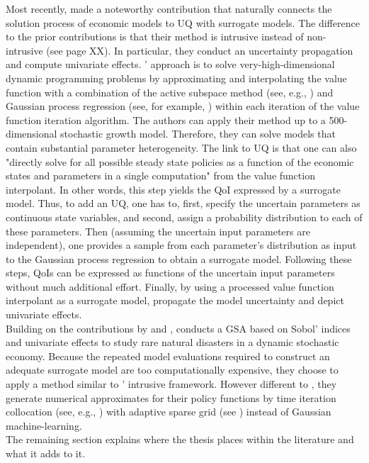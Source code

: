 \newline
Most recently, \cite{Scheidegger.2019} made a noteworthy contribution that naturally connects the solution process of economic models to UQ with surrogate models. The difference to the prior contributions is that their method is intrusive instead of non-intrusive (see page XX). In particular, they conduct an uncertainty propagation and compute univariate effects. \citeauthor{Scheidegger.2019}' approach is to solve very-high-dimensional dynamic programming problems by approximating and interpolating the value function with a combination of the active subspace method (see, e.g., \cite{Constantine.2015}) and Gaussian process regression (see, for example, \cite{Rasmussen.2005}) within each iteration of the value function iteration algorithm. The authors can apply their method up to a 500-dimensional stochastic growth model. Therefore, they can solve models that contain substantial parameter heterogeneity.
The link to UQ is that one can also "directly solve for all possible steady state policies as a function of the economic states and parameters in a single computation" \cite[p.~4]{Scheidegger.2019} from the value function interpolant. In other words, this step yields the QoI expressed by a surrogate model. Thus, to add an UQ, one has to, first, specify the uncertain parameters as continuous state variables, and second, assign a probability distribution to each of these parameters. Then (assuming the uncertain input parameters are independent), one provides a sample from each parameter's distribution as input to the Gaussian process regression to obtain a surrogate model. Following these steps, QoIs can be expressed as functions of the uncertain input parameters without much additional effort. Finally, by using a processed value function interpolant as a surrogate model, \citeauthor{Scheidegger.2019} propagate the model uncertainty and depict univariate effects.\\
\newline
Building on the contributions by \cite{Harenberg.2019} and \cite{Scheidegger.2019}, \cite{Usui.2019} conducts a GSA based on Sobol' indices and univariate effects to study rare natural disasters in a dynamic stochastic economy. Because the repeated model evaluations required to construct an adequate surrogate model are too computationally expensive, they choose to apply a  method similar to \citeauthor{Scheidegger.2019}' intrusive framework. However different to \cite{Scheidegger.2019}, they generate numerical approximates for their policy functions by time iteration collocation (see, e.g., \cite{Judd.1998}) with adaptive sparse grid (see  \cite{Scheidegger.2018}) instead of Gaussian machine-learning.\\
\newline
The remaining section explains where the thesis places within the literature and what it adds to it.

